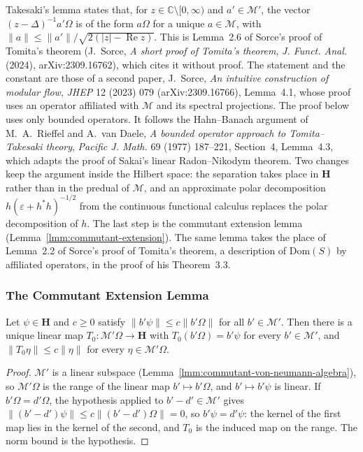 Takesaki's lemma states that, for $z \in \mathbb{C} \setminus [0, \infty)$ and $a' \in \mathcal{M}'$, the vector $(z - \Delta)^{-1}a'\Omega$ is of the form $a\Omega$ for a unique $a \in \mathcal{M}$, with $\|a\| \le \|a'\| / \sqrt{2(|z| - \operatorname{Re} z)}$. This is Lemma~2.6 of Sorce's proof of Tomita's theorem (J.~Sorce, \emph{A short proof of Tomita's theorem}, \emph{J. Funct. Anal.} (2024), arXiv:2309.16762), which cites it without proof. The statement and the constant are those of a second paper, J.~Sorce, \emph{An intuitive construction of modular flow}, \emph{JHEP} 12 (2023) 079 (arXiv:2309.16766), Lemma~4.1, whose proof uses an operator affiliated with $\mathcal{M}$ and its spectral projections. The proof below uses only bounded operators. It follows the Hahn--Banach argument of M.~A.~Rieffel and A.~van Daele, \emph{A bounded operator approach to Tomita--Takesaki theory}, \emph{Pacific J. Math.} 69 (1977) 187--221, Section~4, Lemma~4.3, which adapts the proof of Sakai's linear Radon--Nikodym theorem. Two changes keep the argument inside the Hilbert space: the separation takes place in $\mathbf{H}$ rather than in the predual of $\mathcal{M}$, and an approximate polar decomposition $h(\varepsilon + h^*h)^{-1/2}$ from the continuous functional calculus replaces the polar decomposition of $h$. The last step is the commutant extension lemma (Lemma~\ref{lmm:commutant-extension}). The same lemma takes the place of Lemma~2.2 of Sorce's proof of Tomita's theorem, a description of $\text{Dom}(S)$ by affiliated operators, in the proof of his Theorem~3.3.

\subsubsection{The Commutant Extension Lemma}

\begin{lemma}
    \label{lmm:commutant-extension-well-defined}
    \leanok
    Let $\psi \in \mathbf{H}$ and $c \ge 0$ satisfy $\|b'\psi\| \le c\|b'\Omega\|$ for all $b' \in \mathcal{M}'$. Then there is a unique linear map $T_0 : \mathcal{M}'\Omega \to \mathbf{H}$ with $T_0(b'\Omega) = b'\psi$ for every $b' \in \mathcal{M}'$, and $\|T_0\eta\| \le c\|\eta\|$ for every $\eta \in \mathcal{M}'\Omega$.
\end{lemma}
\begin{proof}
    \leanok
    $\mathcal{M}'$ is a linear subspace (Lemma~\ref{lmm:commutant-von-neumann-algebra}), so $\mathcal{M}'\Omega$ is the range of the linear map $b' \mapsto b'\Omega$, and $b' \mapsto b'\psi$ is linear. If $b'\Omega = d'\Omega$, the hypothesis applied to $b' - d' \in \mathcal{M}'$ gives $\|(b' - d')\psi\| \le c\|(b' - d')\Omega\| = 0$, so $b'\psi = d'\psi$: the kernel of the first map lies in the kernel of the second, and $T_0$ is the induced map on the range. The norm bound is the hypothesis.
\end{proof}

